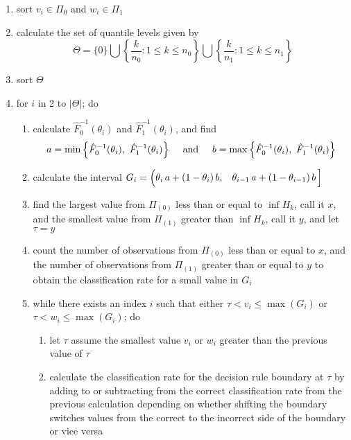 \begin{enumerate}[label=\arabic*., align=left]
\item sort $v_i \in \Pi_{0}$ and $w_i \in \Pi_{1}$
\item calculate the set of quantile levels given by
  \begin{equation*}
    \Theta = \Big\{ 0 \Big\} \bigcup
    \left\{ \frac{k}{n_0}: 1 \leq k \leq n_0 \right\} \bigcup
    \left\{ \frac{k}{n_1}: 1 \leq k \leq n_1 \right\}
  \end{equation*}
\item sort $\Theta$
\item for $i$ in 2 to $|\Theta|$; do
  \begin{enumerate}[label=\alph*)]
  \item calculate $\hat{F}_0^{-1}(\theta_i)$ and $\hat{F}_1^{-1}(\theta_i)$, and
    find
    \begin{equation*}
      a = \min \Big\{ \hat{F}_0^{-1}(\theta_i),~ \hat{F}_1^{-1}(\theta_i) \Big\}
      \hspace{5mm} \text{and} \hspace{5mm}
      b = \max \Big\{ \hat{F}_0^{-1}(\theta_i),~ \hat{F}_1^{-1}(\theta_i) \Big\}
    \end{equation*}
  \item calculate the interval
    $G_i = \Big(
    \theta_i\, a + (1 - \theta_i)\, b,
    \hspace{3mm}
    \theta_{i-1}\, a + (1 - \theta_{i-1})\, b\,
    \Big]$
  \item find the largest value from $\Pi_{(0)}$ less than or equal to
    $\inf H_k$, call it $x$, and the smallest value from $\Pi_{(1)}$ greater
    than $\inf H_k$, call it $y$, and let $\tau = y$
  \item count the number of observations from $\Pi_{(0)}$ less than or
    equal to $x$, and the number of observations from $\Pi_{(1)}$ greater than
    or equal to $y$ to obtain the classification rate for a small value in
    $G_i$
  \item while there exists an index $i$ such that either
    $\tau < v_i \leq \max(G_i)$ or $\tau < w_i \leq \max(G_i)$; do
    \begin{enumerate}[label=\roman*.]
    \item let $\tau$ assume the smallest value $v_i$ or $w_i$ greater than the
      previous value of $\tau$
    \item calculate the classification rate for the decision rule boundary at
      $\tau$ by adding to or subtracting from the correct classification rate
      from the previous calculation depending on whether shifting the boundary
      switches values from the correct to the incorrect side of the boundary or
      vice versa
    \end{enumerate}
  \end{enumerate}
\end{enumerate}

